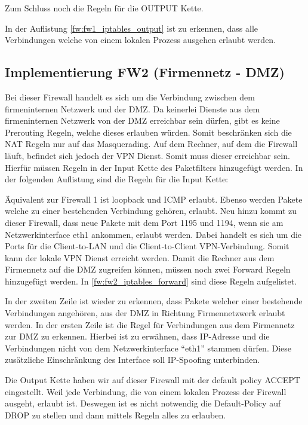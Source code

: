 Zum Schluss noch die Regeln für die OUTPUT Kette.

In der Auflistung \ref{fw:fw1_iptables_output} ist zu erkennen, dass alle Verbindungen welche von einem lokalen Prozess ausgehen erlaubt werden.

\subsection{Implementierung FW2 (Firmennetz - DMZ)}
Bei dieser Firewall handelt es sich um die Verbindung zwischen dem firmeninternen Netzwerk und der DMZ. Da keinerlei Dienste aus dem firmeninternen Netzwerk von der DMZ erreichbar sein dürfen, gibt es keine Prerouting Regeln, welche dieses erlauben würden. Somit beschränken sich die NAT Regeln nur auf das Masquerading.
Auf dem Rechner, auf dem die Firewall läuft, befindet sich jedoch der VPN Dienst. Somit muss dieser erreichbar sein. Hierfür müssen Regeln in der Input Kette des Paketfilters hinzugefügt werden. In der folgenden Auflistung sind die Regeln für die Input Kette:

Äquivalent zur Firewall 1 ist loopback und ICMP erlaubt. Ebenso werden Pakete welche zu einer bestehenden Verbindung gehören, erlaubt. Neu hinzu kommt zu dieser Firewall, dass neue Pakete mit dem Port 1195 und 1194, wenn sie am Netzwerkinterface eth1 ankommen, erlaubt werden. Dabei handelt es sich um die Ports für die Client-to-LAN und die Client-to-Client VPN-Verbindung. Somit kann der lokale VPN Dienst erreicht werden.
Damit die Rechner aus dem Firmennetz auf die DMZ zugreifen können, müssen noch zwei Forward Regeln hinzugefügt werden. In \ref{fw:fw2_iptables_forward} sind diese Regeln aufgelistet.

In der zweiten Zeile ist wieder zu erkennen, dass Pakete welcher einer bestehende Verbindungen angehören, aus der DMZ in Richtung Firmennetzwerk erlaubt werden. In der ersten Zeile ist die Regel für Verbindungen aus dem Firmennetz zur DMZ zu erkennen. Hierbei ist zu erwähnen, dass IP-Adresse und die Verbindungen nicht von dem Netzwerkinterface "`eth1"' stammen dürfen. Diese zusätzliche Einschränkung des Interface soll IP-Spoofing unterbinden.

Die Output Kette haben wir auf dieser Firewall mit der default policy ACCEPT eingestellt. Weil jede Verbindung, die von einem lokalen Prozess der Firewall ausgeht, erlaubt ist. Deswegen ist es nicht notwendig die Default-Policy auf DROP zu stellen und dann mittels Regeln alles zu erlauben.
